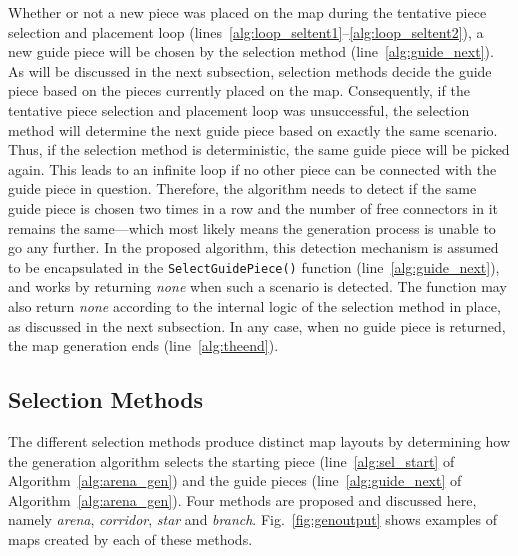 \documentclass[journal]{IEEEtran}
\begin{document}
Whether or not a new piece was placed on the map during the tentative piece selection and
placement loop (lines~\ref{alg:loop_seltent1}--\ref{alg:loop_seltent2}), a new guide piece will
be chosen by the selection method (line~\ref{alg:guide_next}). As will be discussed in the next
subsection, selection methods decide the guide piece based on the pieces currently placed on
the map. Consequently, if the tentative piece selection and placement loop was unsuccessful,
the selection method will determine the next guide piece based on exactly the same scenario.
Thus, if the selection method is deterministic, the same guide piece will be picked
again. This leads to an infinite loop if no other piece can be connected with the guide piece in
question. Therefore, the algorithm needs to detect if the same guide piece is chosen two times in
a row and the number of free connectors in it remains the same---which most likely means the
generation process is unable to go any further. In the proposed algorithm, this detection
mechanism is assumed to be encapsulated in the \texttt{SelectGuidePiece()} function
(line~\ref{alg:guide_next}), and works by returning \textit{none} when such a scenario is
detected. The function may also return \textit{none} according to the internal logic of the
selection method in place, as discussed in the next subsection. In any case, when no guide
piece is returned, the map generation ends (line~\ref{alg:theend}).

\subsection{Selection Methods}
\label{sec:methods:selmethods}

The different selection methods produce distinct map layouts by determining how the generation
algorithm selects the starting piece (line~\ref{alg:sel_start} of Algorithm~\ref{alg:arena_gen})
and the guide pieces (line~\ref{alg:guide_next} of Algorithm~\ref{alg:arena_gen}). Four methods
are proposed and discussed here, namely \emph{arena}, \emph{corridor}, \emph{star} and
\emph{branch}.
Fig.~\ref{fig:genoutput} shows examples of maps created by each of these methods.
\end{document}
